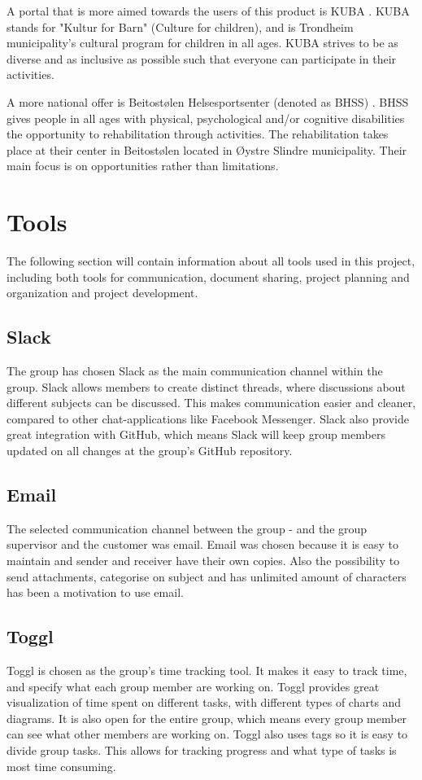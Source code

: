 A portal that is more aimed towards the users of this product is KUBA \cite{KUBA}. KUBA stands for "Kultur for Barn" (Culture for children), and is Trondheim municipality's cultural program for children in all ages. KUBA strives to be as diverse and as inclusive as possible such that everyone can participate in their activities.

A more national offer is Beitostølen Helsesportsenter (denoted as BHSS) \cite{BHSS}. BHSS gives people in all ages with physical, psychological and/or cognitive disabilities the opportunity to rehabilitation through activities. The rehabilitation takes place at their center in Beitostølen located in Øystre Slindre municipality. Their main focus is on opportunities rather than limitations.  

\section{Tools}
\label{tools}
The following section will contain information about all tools used in this project, including both tools for communication, document sharing, project planning and organization and project development.

\subsection{Slack}
The group has chosen Slack \cite{Slack} as the main communication channel within the group. Slack allows members to create distinct threads, where discussions about different subjects can be discussed. This makes communication easier and cleaner, compared to other chat-applications like Facebook Messenger. Slack also provide great integration with GitHub, which means Slack will keep group members updated on all changes at the group's GitHub repository. 

\subsection{Email}
The selected communication channel between the group - and the group supervisor and the customer was email.
Email was chosen because it is easy to maintain and sender and receiver have their own copies. Also the possibility to send attachments, categorise on subject and has unlimited amount of characters has been a motivation to use email.  

\subsection{Toggl}
Toggl \cite{Toggl} is chosen as the group's time tracking tool. It makes it easy to track time, and specify what each group member are working on. Toggl provides great visualization of time spent on different tasks, with different types of charts and diagrams. It is also open for the entire group, which means every group member can see what other members are working on. Toggl also uses tags so it is easy to divide group tasks. This allows for tracking progress and what type of tasks is most time consuming.



